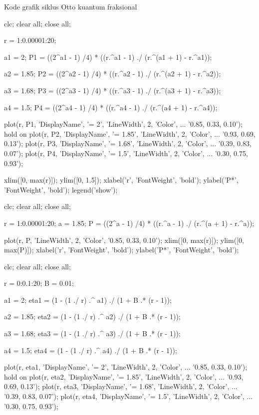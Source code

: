 Kode grafik siklus Otto kuantum fraksional
\begin{verbatim*}
clc; clear all; close all;

r = 1:0.00001:20;

a1 = 2;
P1 = ((2^a1 - 1) /4) * ((r.^a1 - 1) ./ (r.^(a1 + 1) - r.^a1));

a2 = 1.85;
P2 = ((2^a2 - 1) /4) * ((r.^a2 - 1) ./ (r.^(a2 + 1) - r.^a2));

a3 = 1.68;
P3 = ((2^a3 - 1) /4) * ((r.^a3 - 1) ./ (r.^(a3 + 1) - r.^a3));

a4 = 1.5;
P4 = ((2^a4 - 1) /4) * ((r.^a4 - 1) ./ (r.^(a4 + 1) - r.^a4));

plot(r, P1, 'DisplayName', '\alpha = 2', 'LineWidth', 2, 'Color', ...
    '0.85, 0.33, 0.10');
hold on
plot(r, P2, 'DisplayName', '\alpha = 1.85', 'LineWidth', 2, 'Color', ...
    '0.93, 0.69, 0.13');
plot(r, P3, 'DisplayName', '\alpha = 1.68', 'LineWidth', 2, 'Color', ...
    '0.39, 0.83, 0.07');
plot(r, P4, 'DisplayName', '\alpha = 1.5', 'LineWidth', 2, 'Color', ...
    '0.30, 0.75, 0.93');

xlim([0, max(r)]);
ylim([0, 1.5]);
xlabel('r', 'FontWeight', 'bold');
ylabel('P*', 'FontWeight', 'bold');
legend('show');

clc; clear all; close all;

r = 1:0.00001:20;
a = 1.85;
P = ((2^a - 1) /4) * ((r.^a - 1) ./ (r.^(a + 1) - r.^a));

plot(r, P, 'LineWidth', 2, 'Color', '0.85, 0.33, 0.10');
xlim([0, max(r)]);
ylim([0, max(P)]);
xlabel('r', 'FontWeight', 'bold');
ylabel('P*', 'FontWeight', 'bold');

clc; clear all; close all;

r = 0:0.1:20;
B = 0.01;

a1 = 2;
eta1 = (1 - (1 ./ r) .^ a1) ./ (1 + B .* (r - 1));

a2 = 1.85;
eta2 = (1 - (1 ./ r) .^ a2) ./ (1 + B .* (r - 1));

a3 = 1.68;
eta3 = (1 - (1 ./ r) .^ a3) ./ (1 + B .* (r - 1));

a4 = 1.5;
eta4 = (1 - (1 ./ r) .^ a4) ./ (1 + B .* (r - 1));

plot(r, eta1, 'DisplayName', '\alpha = 2', 'LineWidth', 2, 'Color', ...
    '0.85, 0.33, 0.10');
hold on
plot(r, eta2, 'DisplayName', '\alpha = 1.85', 'LineWidth', 2, 'Color', ...
    '0.93, 0.69, 0.13');
plot(r, eta3, 'DisplayName', '\alpha = 1.68', 'LineWidth', 2, 'Color', ...
    '0.39, 0.83, 0.07');
plot(r, eta4, 'DisplayName', '\alpha = 1.5', 'LineWidth', 2, 'Color', ...
    '0.30, 0.75, 0.93');


\end{verbatim*}

